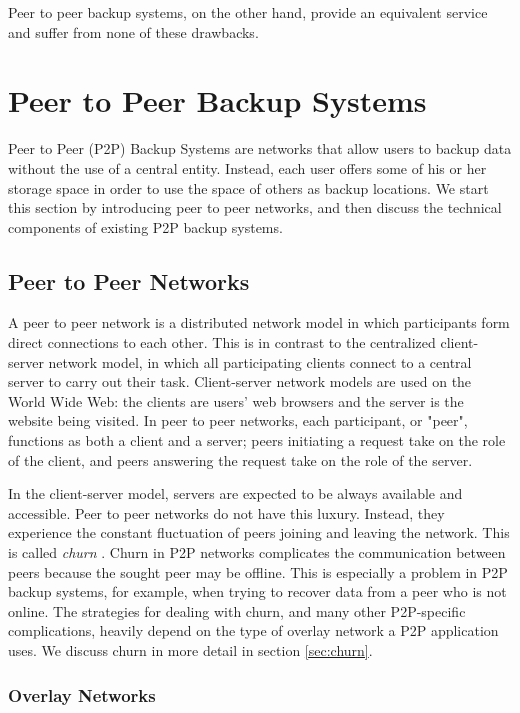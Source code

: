 \documentclass[12pt]{report}
\begin{document}
Peer to peer backup systems, on the other hand, provide an equivalent service and suffer from none of these drawbacks. 

\section{Peer to Peer Backup Systems}

Peer to Peer (P2P) Backup Systems are networks that allow users to backup data without the use of a central entity. Instead, each user offers some of his or her storage space in order to use the space of others as backup locations. We start this section by introducing peer to peer networks, and then discuss the technical components of existing P2P backup systems.

\subsection{Peer to Peer Networks}

A peer to peer network is a distributed network model in which participants form direct connections to each other. This is in contrast to the centralized client-server network model, in which all participating clients connect to a central server to carry out their task. Client-server network models are used on the World Wide Web: the clients are users' web browsers and the server is the website being visited. In peer to peer networks, each participant, or "peer", functions as both a client and a server; peers initiating a request take on the role of the client, and peers answering the request take on the role of the server.

In the client-server model, servers are expected to be always available and accessible. Peer to peer networks do not have this luxury. Instead, they experience the constant fluctuation of peers joining and leaving the network. This is called \textit{churn} \cite{StorageSearchP2PNetworks}. Churn in P2P networks complicates the communication between peers because the sought peer may be offline. This is especially a problem in P2P backup systems, for example, when trying to recover data from a peer who is not online. The strategies for dealing with churn, and many other P2P-specific complications, heavily depend on the type of overlay network a P2P application uses. We discuss churn in more detail in section \ref{sec:churn}.


\subsubsection{Overlay Networks}
\end{document}
